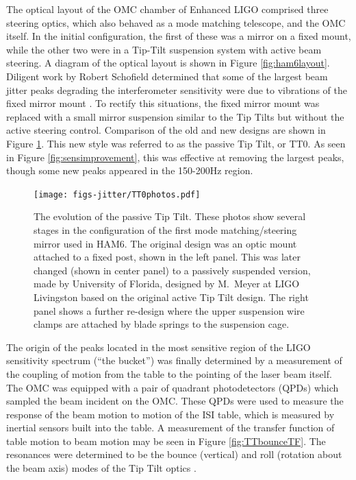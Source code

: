 The optical layout of the OMC chamber of Enhanced LIGO comprised three steering optics, which also behaved as a mode matching telescope, and the OMC itself. %
In the initial configuration, the first of these was a mirror on a fixed mount, while the other two were in a Tip-Tilt suspension system with active beam steering. %
A diagram of the optical layout is shown in Figure \ref{fig:ham6layout}. %
Diligent work by Robert Schofield determined that some of the largest beam jitter peaks degrading the interferometer sensitivity were due to vibrations of the fixed mirror mount \cite{fixedmountpeaks}. %
To rectify this situations, the fixed mirror mount was replaced with a small mirror suspension similar to the Tip Tilts but without the active steering control. %
Comparison of the old and new designs are shown in Figure \ref{fig:TT0photos}. %
This new style was referred to as the passive Tip Tilt, or TT0. %
As seen in Figure \ref{fig:sensimprovement}, this was effective at removing the largest peaks, though some new peaks appeared in the 150-200Hz region.

\begin{figure}
  \begin{center}
  \leavevmode
  \texttt{[image: figs-jitter/TT0photos.pdf]}
  \end{center}
  \caption[The evolution of the passive Tip Tilt.]{The evolution of the passive Tip Tilt. These photos show several stages in the configuration of the first mode matching/steering mirror used in HAM6. The original design was an optic mount attached to a fixed post, shown in the left panel. This was later changed (shown in center panel) to a passively suspended version, made by University of Florida, designed by M.\ Meyer at LIGO Livingston based on the original active Tip Tilt design. The right panel shows a further re-design where the upper suspension wire clamps are attached by blade springs to the suspension cage.}
  \label{fig:TT0photos}
\end{figure}

The origin of the peaks located in the most sensitive region of the LIGO sensitivity spectrum (``the bucket'') was finally determined by a measurement of the coupling of motion from the table to the pointing of the laser beam itself. %
The OMC was equipped with a pair of quadrant photodetectors (QPDs) which sampled the beam incident on the OMC. %
These QPDs were used to measure the response of the beam motion to motion of the ISI table, which is measured by inertial sensors built into the table. %
A measurement of the transfer function of table motion to beam motion may be seen in Figure \ref{fig:TTbounceTF}. %
The resonances were determined to be the bounce (vertical) and roll (rotation about the beam axis) modes of the Tip Tilt optics \cite{tt1bounce}.

